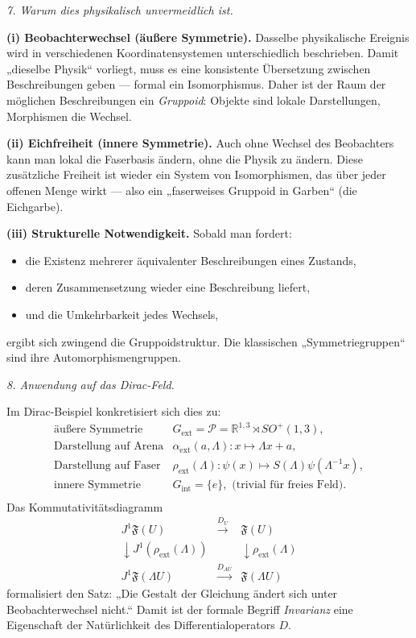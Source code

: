 \documentclass[10pt, letterpaper]{article}
\newcommand{\R}{\mathbb{R}}
\begin{document}
\bigskip
\emph{7. Warum dies physikalisch unvermeidlich ist.}

\textbf{(i) Beobachterwechsel (äußere Symmetrie).}
Dasselbe physikalische Ereignis wird in verschiedenen Koordinatensystemen
unterschiedlich beschrieben.  
Damit „dieselbe Physik“ vorliegt, muss es eine konsistente Übersetzung
zwischen Beschreibungen geben — formal ein Isomorphismus.
Daher ist der Raum der möglichen Beschreibungen ein \emph{Gruppoid}:
Objekte sind lokale Darstellungen, Morphismen die Wechsel.

\textbf{(ii) Eichfreiheit (innere Symmetrie).}
Auch ohne Wechsel des Beobachters kann man lokal die Faserbasis ändern,
ohne die Physik zu ändern.
Diese zusätzliche Freiheit ist wieder ein System von Isomorphismen,
das über jeder offenen Menge wirkt — also ein
„faserweises Gruppoid in Garben“ (die Eichgarbe).

\textbf{(iii) Strukturelle Notwendigkeit.}
Sobald man fordert:
\begin{itemize}
\item die Existenz mehrerer äquivalenter Beschreibungen eines Zustands,
\item deren Zusammensetzung wieder eine Beschreibung liefert,
\item und die Umkehrbarkeit jedes Wechsels,
\end{itemize}
ergibt sich zwingend die Gruppoidstruktur.
Die klassischen „Symmetriegruppen“ sind ihre Automorphismengruppen.

\bigskip
\emph{8. Anwendung auf das Dirac-Feld.}

Im Dirac-Beispiel konkretisiert sich dies zu:
\[
\begin{array}{ll}
\text{äußere Symmetrie} &
G_{\mathrm{ext}}=\mathcal P=\R^{1,3}\rtimes SO^+(1,3),\\[0.2em]
\text{Darstellung auf Arena} &
\alpha_{\mathrm{ext}}(a,\Lambda):x\mapsto \Lambda x+a,\\[0.2em]
\text{Darstellung auf Faser} &
\rho_{\mathrm{ext}}(\Lambda):\psi(x)\mapsto S(\Lambda)\psi(\Lambda^{-1}x),\\[0.2em]
\text{innere Symmetrie} &
G_{\mathrm{int}}=\{e\},\text{ (trivial für freies Feld)}.\\[0.2em]
\end{array}
\]
Das Kommutativitätsdiagramm
\[
\begin{array}{ccc}
J^1\mathfrak F(U) & \xrightarrow{D_U} & \mathfrak F(U)\\
\downarrow J^1(\rho_{\mathrm{ext}}(\Lambda)) & & \downarrow \rho_{\mathrm{ext}}(\Lambda)\\
J^1\mathfrak F(\Lambda U) & \xrightarrow{D_{\Lambda U}} & \mathfrak F(\Lambda U)
\end{array}
\]
formalisiert den Satz:
„Die Gestalt der Gleichung ändert sich unter Beobachterwechsel nicht.“
Damit ist der formale Begriff \emph{Invarianz} eine Eigenschaft der
Natürlichkeit des Differentialoperators \(D\).
\end{document}
